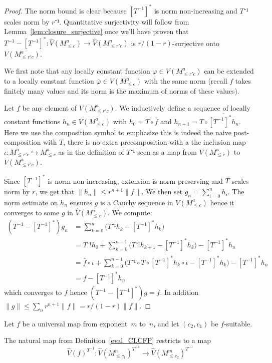 \begin{proof}
  \leanok
  The norm bound is clear because $[T^{-1}]^\ast$ is norm non-increasing and
  $T⁻¹$ scales norm by $r⁻¹$. Quantitative surjectivity will follow from
  Lemma~\ref{lem:closure_surjective} once we'll have proven that
  $T^{-1}-[T^{-1}]^\ast : \widehat{V}(M_{\leq c}^a) → \widehat{V}(M_{\leq r'c}^a)$
  is $r/(1-r)$-surjective onto $V(M_{\leq r'c}^a)$.

  We first note that any locally constant function $φ ∈ V(M_{\leq r'c}^a)$
  can be extended to a locally constant function $\bar φ ∈ V(M_{\leq c}^a)$
  with the same norm (recall $f$ takes finitely many values and its norm is the
  maximum of norms of these values).

  Let $f$ be any element of $V(M_{\leq r'c}^a)$.
  We inductively define a sequence of locally constant functions
  $h_n ∈ V(M_{\leq c}^a)$ with $h_0 = T ∘ \bar f$ and
  $h_{n+1} = T ∘ \overline{[T^{-1}]^\ast h_n}$.
  Here we use the composition symbol to emphasize this is indeed the naive
  post-composition with $T$, there is no extra precomposition with a
  the inclusion map $ι : M_{\leq r'c}^a ↪ M_{\leq c}^a$ as in the definition
  of $T⁻¹$ seen as a map from $V(M_{\leq c}^a)$ to $V(M_{\leq r'c}^a)$.

  Since $[T^{-1}]^\ast$ is norm non-increasing, extension is norm preserving
  and $T$ scales norm by $r$, we get that $\|h_n\| ≤ r^{n+1}\|f\|$.
  We then set $g_n = \sum_{i = 0}^n h_i$. The norm estimate on $h_n$ ensures
  $g$ is a Cauchy sequence in $V(M_{\leq c}^a)$ hence it converges to some
  $g$ in $\widehat{V}(M_{\leq c}^a)$.
  We compute:
  \begin{align*}
    (T^{-1}-[T^{-1}]^\ast)g_n &= ∑_{k=0}^n \Big(T⁻¹h_k - [T^{-1}]^\ast h_k\Big) \\
                              &= T⁻¹h_0 + ∑_{k=0}^{n-1} \Big(T⁻¹h_{k+1} - [T^{-1}]^\ast h_k\Big) - [T^{-1}]^\ast h_n\\
                              &= \bar f ∘ ι + ∑_{k=0}^{n-1} \Big( T⁻¹∘ T ∘ \overline{[T^{-1}]^\ast h_k} ∘ ι - [T^{-1}]^\ast h_k\Big) - [T^{-1}]^\ast h_n\\
                              & = f - [T^{-1}]^\ast h_n
  \end{align*}
  which converges to $f$ hence $(T^{-1}-[T^{-1}]^\ast)g = f$.
  In addition $\|g\| ≤ \sum_n r^{n+1}\|f\| = r/(1-r)\|f\|$.
\end{proof}

\begin{definition}
  \label{eval_CLCFPTinv}
  \leanok
  Let $f$ be a universal map from exponent~$m$ to~$n$,
  and let $(c_2, c_1)$ be $f$-suitable.

  The natural map from Definition~\ref{eval_CLCFP}
  restricts to a map
  \[
    \hat V(f)^{T^{-1}} \colon \hat V(M_{\le c_1}^n)^{T^{-1}} \to \hat V(M_{\le c_2}^m)^{T^{-1}}
  \]
\end{definition}

